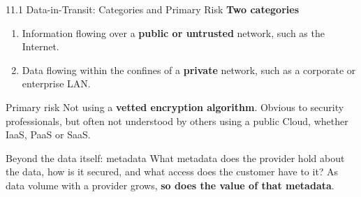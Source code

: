 \documentclass[11pt,aspectratio=169]{beamer}
\newcommand{\kw}[1]{\textbf{\color{accent}#1}}
\begin{document}
\begin{frame}{11.1 Data-in-Transit: Categories and Primary Risk}
  \small
  \textbf{Two categories}
  \begin{enumerate}\small\setlength{\itemsep}{0.3em}
    \item Information flowing over a \kw{public or untrusted} network, such as
          the Internet.
    \item Data flowing within the confines of a \kw{private} network, such as a
          corporate or enterprise LAN.
  \end{enumerate}
  \vspace{0.8em}

  \begin{alertblock}{Primary risk}
    \small
    Not using a \kw{vetted encryption algorithm}. Obvious to security
    professionals, but often not understood by others using a public Cloud,
    whether IaaS, PaaS or SaaS.
  \end{alertblock}
  \vspace{0.4em}

  \begin{block}{Beyond the data itself: metadata}
    \small
    What metadata does the provider hold about the data, how is it secured, and
    what access does the customer have to it? As data volume with a provider
    grows, \kw{so does the value of that metadata}.
  \end{block}
\end{frame}
\end{document}
